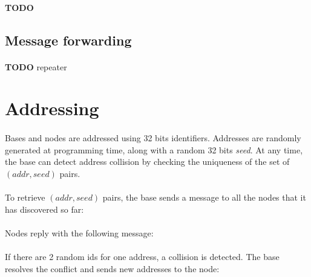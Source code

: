 \documentclass[a4paper, 11pt]{article}
\begin{document}
\paragraph{}
\textbf{TODO}

\subsection{Message forwarding}
\paragraph{}
\textbf{TODO} repeater


\clearpage
\section{Addressing}
\paragraph{}
Bases and nodes are addressed using 32 bits identifiers. Addresses are
randomly generated at programming time, along with a random 32 bits
\textit{seed}. At any time, the base can detect address collision by
checking the uniqueness of the set of $(addr,seed)$ pairs.
\paragraph{}
To retrieve $(addr,seed)$ pairs, the base sends a message to all the
nodes that it has discovered so far:

\paragraph{}
Nodes reply with the following message:

\paragraph{}
If there are 2 random ids for one address, a collision is detected. The base
resolves the conflict and sends new addresses to the node:
\end{document}
